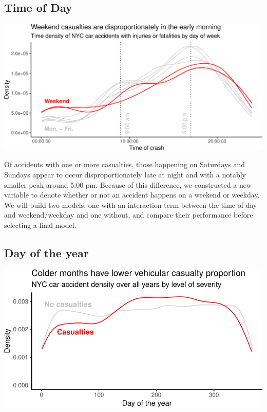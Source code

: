 \documentclass[
  letterpaper,
  DIV=11,
  numbers=noendperiod]{scrartcl}
\begin{document}
\hypertarget{time-of-day}{%
\subsection{Time of Day}\label{time-of-day}}

\includegraphics{project_files/figure-pdf/viz-time-density-1.pdf}

Of accidents with one or more casualties, those happening on Saturdays
and Sundays appear to occur disproportionately late at night and with a
notably smaller peak around 5:00 pm. Because of this difference, we
constructed a new variable to denote whether or not an accident happens
on a weekend or weekday. We will build two models, one with an
interaction term between the time of day and weekend/weekday and one
without, and compare their performance before selecting a final model.

\hypertarget{day-of-the-year}{%
\subsection{Day of the year}\label{day-of-the-year}}

\includegraphics{project_files/figure-pdf/viz-density-severity-day-of-year-1.pdf}
\end{document}
